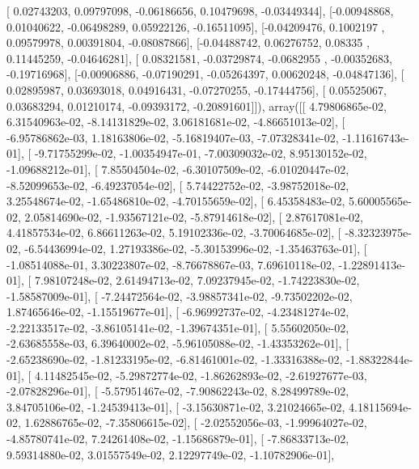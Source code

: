 \documentclass{article}
\begin{document}
       [ 0.02743203,  0.09797098, -0.06186656,  0.10479698, -0.03449344],
       [-0.00948868,  0.01040622, -0.06498289,  0.05922126, -0.16511095],
       [-0.04209476,  0.1002197 ,  0.09579978,  0.00391804, -0.08087866],
       [-0.04488742,  0.06276752,  0.08335   ,  0.11445259, -0.04646281],
       [ 0.08321581, -0.03729874, -0.0682955 , -0.00352683, -0.19716968],
       [-0.00906886, -0.07190291, -0.05264397,  0.00620248, -0.04847136],
       [ 0.02895987,  0.03693018,  0.04916431, -0.07270255, -0.17444756],
       [ 0.05525067,  0.03683294,  0.01210174, -0.09393172, -0.20891601]]), array([[  4.79806865e-02,   6.31540963e-02,  -8.14131829e-02,
          3.06181681e-02,  -4.86651013e-02],
       [ -6.95786862e-03,   1.18163806e-02,  -5.16819407e-03,
         -7.07328341e-02,  -1.11616743e-01],
       [ -9.71755299e-02,  -1.00354947e-01,  -7.00309032e-02,
          8.95130152e-02,  -1.09688212e-01],
       [  7.85504504e-02,  -6.30107509e-02,  -6.01020447e-02,
         -8.52099653e-02,  -6.49237054e-02],
       [  5.74422752e-02,  -3.98752018e-02,   3.25548674e-02,
         -1.65486810e-02,  -4.70155659e-02],
       [  6.45358483e-02,   5.60005565e-02,   2.05814690e-02,
         -1.93567121e-02,  -5.87914618e-02],
       [  2.87617081e-02,   4.41857534e-02,   6.86611263e-02,
          5.19102336e-02,  -3.70064685e-02],
       [ -8.32323975e-02,  -6.54436994e-02,   1.27193386e-02,
         -5.30153996e-02,  -1.35463763e-01],
       [ -1.08514088e-01,   3.30223807e-02,  -8.76678867e-03,
          7.69610118e-02,  -1.22891413e-01],
       [  7.98107248e-02,   2.61494713e-02,   7.09237945e-02,
         -1.74223830e-02,  -1.58587009e-01],
       [ -7.24472564e-02,  -3.98857341e-02,  -9.73502202e-02,
          1.87465646e-02,  -1.15519677e-01],
       [ -6.96992737e-02,  -4.23481274e-02,  -2.22133517e-02,
         -3.86105141e-02,  -1.39674351e-01],
       [  5.55602050e-02,  -2.63685558e-03,   6.39640002e-02,
         -5.96105088e-02,  -1.43353262e-01],
       [ -2.65238690e-02,  -1.81233195e-02,  -6.81461001e-02,
         -1.33316388e-02,  -1.88322844e-01],
       [  4.11482545e-02,  -5.29872774e-02,  -1.86262893e-02,
         -2.61927677e-03,  -2.07828296e-01],
       [ -5.57951467e-02,  -7.90862243e-02,   8.28499789e-02,
          3.84705106e-02,  -1.24539413e-01],
       [ -3.15630871e-02,   3.21024665e-02,   4.18115694e-02,
          1.62886765e-02,  -7.35806615e-02],
       [ -2.02552056e-03,  -1.99964027e-02,  -4.85780741e-02,
          7.24261408e-02,  -1.15686879e-01],
       [ -7.86833713e-02,   9.59314880e-02,   3.01557549e-02,
          2.12297749e-02,  -1.10782906e-01],
\end{document}
